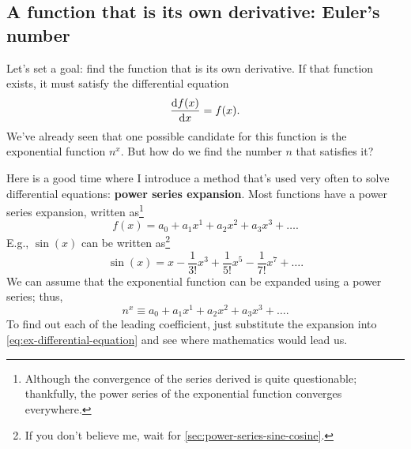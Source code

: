 \subsection{A function that is its own derivative: Euler's number}
\label{sec:function_equals_own_derivative}

Let's set a goal: find the function that is its own derivative. If that function exists, it must satisfy the differential equation
\begin{equation}
  \odv{f(x)}{x} = f(x). \label{eq:ex-differential-equation}
\end{equation}
We've already seen that one possible candidate for this function is the exponential function $n^x$. But how do we find the number $n$ that satisfies it?

Here is a good time where I introduce a method that's used very often to solve differential equations: \textbf{power series expansion}. Most functions have a power series expansion, written as\footnote{Although the convergence of the series derived is quite questionable; thankfully, the power series of the exponential function converges everywhere.}
\begin{equation}
  f(x) = a_0 + a_1x^1 + a_2x^2 + a_3x^3 + \dots.
\end{equation}
E.g., $\sin(x)$ can be written as\footnote{If you don't believe me, wait for \cref{sec:power-series-sine-cosine}.}
\begin{equation}
  \sin(x) = x - \frac{1}{3!}x^3 + \frac{1}{5!}x^5 - \frac{1}{7!}x^7 + \dots.
\end{equation}
We can assume that the exponential function can be expanded using a power series; thus,
\begin{equation}
  n^x \equiv a_0 + a_1x^1 + a_2x^2 + a_3x^3 + \dots.
\end{equation}
To find out each of the leading coefficient, just substitute the expansion into \cref{eq:ex-differential-equation} and see where mathematics would lead us.

